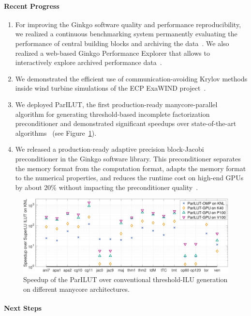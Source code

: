 \paragraph{Recent Progress}
\begin{enumerate}
\item 
For improving the Ginkgo software quality and performance reproducibility, we 
realized a continuous benchmarking system permanently evaluating the 
performance of central building blocks and archiving the data~\cite{pasc_anzt}. 
We 
also realized a web-based Ginkgo Performance Explorer that allows to 
interactively explore archived performance 
data~\cite{gpewebpage}.
\item
We demonstrated the efficient use of communication-avoiding Krylov methods 
inside wind turbine simulations of the ECP ExaWIND 
project~\cite{cakrylovexawind}.
\item 
We deployed ParILUT, the first production-ready manycore-parallel algorithm for 
generating threshold-based incomplete factorization preconditioner and 
demonstrated significant speedups over state-of-the-art 
algorithms~\cite{ipdps_anzt} (see Figure~\ref{fig:ParILUTperf}).
\item
We released a production-ready adaptive precision block-Jacobi preconditioner 
in the Ginkgo software library. This preconditioner separates the memory format 
from the computation format, adapts the memory format to the numerical 
properties, and reduces the runtime cost on high-end GPUs by about 20\% without 
impacting the preconditioner quality~\cite{toms_anzt}.
\end{enumerate}

\begin{figure}[htb]
	\centering
	\includegraphics[width=6in]{projects/2.3.3-MathLibs/2.3.3.13-CLOVER/parilutspeedup}
	\caption{\label{fig:ParILUTperf}Speedup of the ParILUT over conventional 
	threshold-ILU generation on different manycore architectures.}
\end{figure}


\paragraph{Next Steps}


